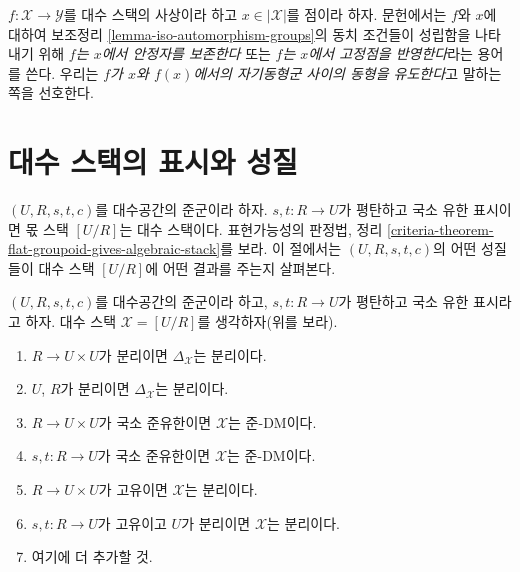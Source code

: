 \begin{remark}
\label{remark-identify-automorphism-groups}
$f : \mathcal{X} \to \mathcal{Y}$를 대수 스택의 사상이라 하고
$x \in |\mathcal{X}|$를 점이라 하자. 문헌에서는 $f$와 $x$에 대하여
보조정리 \ref{lemma-iso-automorphism-groups}의 동치 조건들이 성립함을
나타내기 위해 {\it $f$는 $x$에서 안정자를 보존한다} 또는
{\it $f$는 $x$에서 고정점을 반영한다}라는 용어를 쓴다.
우리는 {\it $f$가 $x$와 $f(x)$에서의 자기동형군 사이의 동형을
유도한다}고 말하는 쪽을 선호한다.
\end{remark}





\section{대수 스택의 표시와 성질}
\label{section-presentations-properties}

\noindent
$(U, R, s, t, c)$를 대수공간의 준군이라 하자.
$s, t : R \to U$가 평탄하고 국소 유한 표시이면 몫 스택 $[U/R]$는
대수 스택이다. 표현가능성의 판정법, 정리
\ref{criteria-theorem-flat-groupoid-gives-algebraic-stack}를 보라.
이 절에서는 $(U, R, s, t, c)$의 어떤 성질들이 대수 스택 $[U/R]$에
어떤 결과를 주는지 살펴본다.

\begin{lemma}
\label{lemma-properties-diagonal-from-presentation}
$(U, R, s, t, c)$를 대수공간의 준군이라 하고,
$s, t : R \to U$가 평탄하고 국소 유한 표시라고 하자.
대수 스택 $\mathcal{X} = [U/R]$를 생각하자(위를 보라).
\begin{enumerate}
\item $R \to U \times U$가 분리이면 $\Delta_\mathcal{X}$는 분리이다.
\item $U$, $R$가 분리이면 $\Delta_\mathcal{X}$는 분리이다.
\item $R \to U \times U$가 국소 준유한이면 $\mathcal{X}$는 준-DM이다.
\item $s, t : R \to U$가 국소 준유한이면 $\mathcal{X}$는 준-DM이다.
\item $R \to U \times U$가 고유이면 $\mathcal{X}$는 분리이다.
\item $s, t : R \to U$가 고유이고 $U$가 분리이면 $\mathcal{X}$는
분리이다.
\item 여기에 더 추가할 것.%
\end{enumerate}
\end{lemma}

